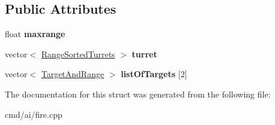 \subsection*{Public Attributes}
\begin{DoxyCompactItemize}
\item 
float {\bfseries maxrange}\hypertarget{structTurretBin_a53daec62e398e78fe1cffb2f9fa645b2}{}\label{structTurretBin_a53daec62e398e78fe1cffb2f9fa645b2}

\item 
vector$<$ \hyperlink{structRangeSortedTurrets}{Range\+Sorted\+Turrets} $>$ {\bfseries turret}\hypertarget{structTurretBin_a44ed434b510cc2141c08c978e305540f}{}\label{structTurretBin_a44ed434b510cc2141c08c978e305540f}

\item 
vector$<$ \hyperlink{structTargetAndRange}{Target\+And\+Range} $>$ {\bfseries list\+Of\+Targets} \mbox{[}2\mbox{]}\hypertarget{structTurretBin_a041fa4ff9da94bccbcd60c00b495d78c}{}\label{structTurretBin_a041fa4ff9da94bccbcd60c00b495d78c}

\end{DoxyCompactItemize}


The documentation for this struct was generated from the following file\+:\begin{DoxyCompactItemize}
\item 
cmd/ai/fire.\+cpp\end{DoxyCompactItemize}
